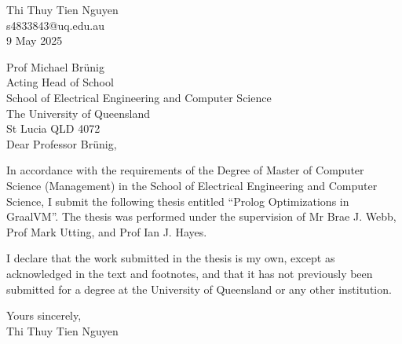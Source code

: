\begin{flushright}
Thi Thuy Tien Nguyen \\
s4833843@uq.edu.au \\
9 May 2025
\end{flushright}

Prof Michael Brünig \\
Acting Head of School \\
School of Electrical Engineering and Computer Science \\
The University of Queensland \\
St Lucia  QLD  4072 \\

Dear Professor Brünig, \\

\par
\hspace*{2em} In accordance with the requirements of the Degree of Master of Computer Science (Management) in the School of Electrical Engineering and Computer Science, I submit the following thesis entitled
“Prolog Optimizations in GraalVM”. The thesis was performed under the supervision of Mr Brae J. Webb, Prof Mark Utting, and Prof Ian J. Hayes. \\
\par
\hspace*{2em} I declare that the work submitted in the thesis is my own, except as acknowledged in the text and footnotes, and that it has not previously been submitted for a degree at the University of Queensland or any other institution.

\begin{flushright}
Yours sincerely, \\
Thi Thuy Tien Nguyen \\
\end{flushright}
